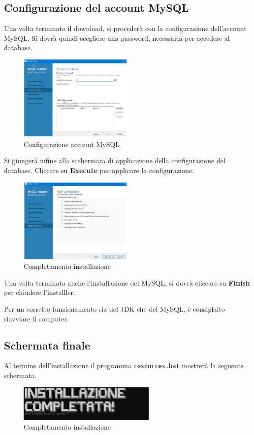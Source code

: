 \subsection{Configurazione del account MySQL}
Una volta terminato il download, si procederà con la configurazione dell'account MySQL. Si dovrà quindi scegliere una password, necessaria per accedere al database. 


\begin{figure}[h!]
    \centering
    \includegraphics[width= 0.5\textwidth]{images/setup vero e proio musql.png}
    \caption{Configurazione account MySQL}
\end{figure}


Si giungerà infine alla scehermata di applicazione della configurazione del database. Cliccare su \textbf{Execute} per applicare la configurazione.

\begin{figure}[h!]
    \centering
    \includegraphics[width= 0.5\textwidth]{images/completamenot.png}
    \caption{Completamento installazione}
\end{figure}

Una volta terminata anche l'installazione del MySQL, si dovrà cliccare su \textbf{Finish} per chiudere l'installler. 

\begin{tcolorbox}[  colback=white!5!white, colframe=gray, title={Avvertenza} ]
    Per un corretto funzionamento sia del JDK che del MySQL, è consiglaito riavviare il computer.
    
\end{tcolorbox}


\subsection{Schermata finale}
Al termine dell'installazione il programma \texttt{resources.bat} mostrerà la seguente schermata. 

\begin{figure}[h!]
    \centering
    \includegraphics[width= 0.6\textwidth]{images/insytllazione compeltata.png}
    \caption{Completamento installazione}
\end{figure}